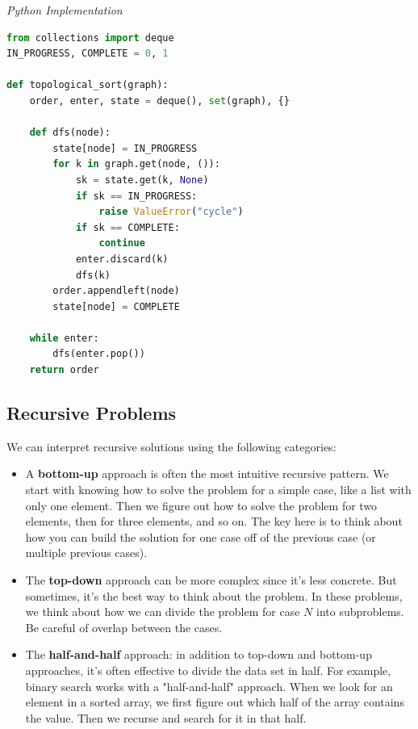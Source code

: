 \documentclass{article}
\begin{document}
\vspace{8pt} \emph{Python Implementation}
\begin{lstlisting}[language=Python]
from collections import deque
IN_PROGRESS, COMPLETE = 0, 1

def topological_sort(graph):
    order, enter, state = deque(), set(graph), {}

    def dfs(node):
        state[node] = IN_PROGRESS
        for k in graph.get(node, ()):
            sk = state.get(k, None)
            if sk == IN_PROGRESS:
                raise ValueError("cycle")
            if sk == COMPLETE:
                continue
            enter.discard(k)
            dfs(k)
        order.appendleft(node)
        state[node] = COMPLETE

    while enter:
        dfs(enter.pop())
    return order
\end{lstlisting}


    \subsection{Recursive Problems}
    We can interpret recursive solutions using the following categories:
    \begin{itemize}
        \item A \textbf{bottom-up} approach is often the most intuitive recursive pattern. We start with knowing how to solve the problem for a simple case, like a list with only one element. Then we figure out how to solve the problem for two elements, then for three elements, and so on. The key here is to think about how you can build the solution for one case off of the previous case (or multiple previous cases).
        
        \item The \textbf{top-down} approach can be more complex since it's less concrete. But sometimes, it's the best way to think about the problem. In these problems, we think about how we can divide the problem for case $N$ into subproblems. Be careful of overlap between the cases. 
        
        \item The \textbf{half-and-half} approach: in addition to top-down and bottom-up approaches, it's often effective to divide the data set in half. For example, binary search works with a "half-and-half" approach. When we look for an element in a sorted array, we first figure out which half of the array contains the value. Then we recurse and search for it in that half.
    \end{itemize}
    
\end{document}
